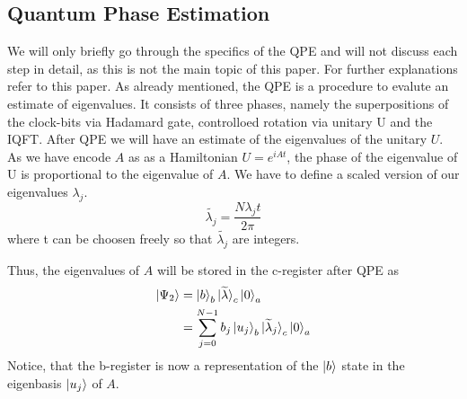 \subsection{Quantum Phase Estimation}
We will only briefly go through the specifics of the QPE and will not discuss each step in detail, as this is not the main topic of this paper. 
For further explanations refer to this paper.
As already mentioned, the QPE is a procedure to evalute an estimate of eigenvalues. 
It consists of three phases, namely the superpositions of the clock-bits via Hadamard gate, controlloed rotation via unitary U and the IQFT.
After QPE we will have an estimate of the eigenvalues of the unitary $U$. 
As we have encode $A$ as as a Hamiltonian $U = e^{iAt}$, the phase of the eigenvalue of U is proportional to the eigenvalue of $A$.
We have to define a scaled version of our eigenvalues $\lambda_j$.
\begin{equation}
\widetilde{\lambda_j} = \frac {N\lambda_jt}{2\pi}
\end{equation}
where t can be choosen freely so that $\widetilde{\lambda_j}$ are integers. 

Thus, the eigenvalues of $A$ will be stored in the c-register after QPE as
\begin{equation}
\begin{split}
\ket{\Psi_2} &= \ket{b}_b \ket{\widetilde{\lambda}}_c\ket{0}_a \\
& =\sum_{j=0}^{N-1} b_j \ket{u_j}_b \ket{\widetilde{\lambda}_j}_c \ket 0_a
\end{split}
\end{equation}
Notice, that the b-register is now a representation of the $\ket b$ state in the eigenbasis $\ket{u_j}$ of $A$.




